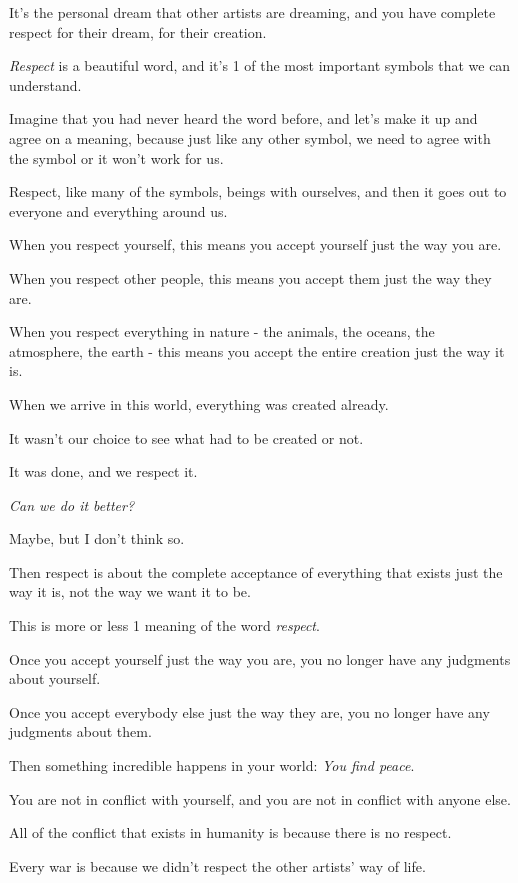 \documentclass{article}
\numberwithin{equation}{section}
\begin{document}
It's the personal dream that other artists are dreaming, and you have complete respect for their dream, for their creation.

%
\textit{Respect} is a beautiful word, and it's 1 of the most important symbols that we can understand.

Imagine that you had never heard the word before, and let's make it up and agree on a meaning, because just like any other symbol, we need to agree with the symbol or it won't work for us.

Respect, like many of the symbols, beings with ourselves, and then it goes out to everyone and everything around us.


%
When you respect yourself, this means you accept yourself just the way you are.

When you respect other people, this means you accept them just the way they are.

When you respect everything in nature - the animals, the oceans, the atmosphere, the earth - this means you accept the entire creation just the way it is.

When we arrive in this world, everything was created already.

It wasn't our choice to see what had to be created or not.

It was done, and we respect it.

\textit{Can we do it better?}

Maybe, but I don't think so.

Then respect is about the complete acceptance of everything that exists just the way it is, not the way we want it to be.

This is more or less 1 meaning of the word \textit{respect}.

%
Once you accept yourself just the way you are, you no longer have any judgments about yourself.

Once you accept everybody else just the way they are, you no longer have any judgments about them.

Then something incredible happens in your world: \textit{You find peace}.

You are not in conflict with yourself, and you are not in conflict with anyone else.

All of the conflict that exists in humanity is because there is no respect.

Every war is because we didn't respect the other artists' way of life.
\end{document}
